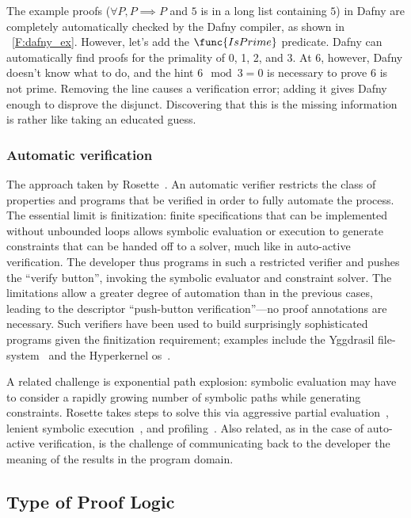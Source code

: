 The example proofs (\(\forall P, P \implies P\) and \(5\) is in a long list
containing \(5\)) in Dafny are completely automatically checked by the Dafny
compiler, as shown in \figurename~\ref{F:dafny_ex}. However, let's add the
\(\func{IsPrime}\) predicate. Dafny can automatically find proofs for the
primality of 0, 1, 2, and 3. At 6, however, Dafny doesn't know what to do, and
the hint \(6 \mod 3 = 0\) is necessary to prove 6 is not prime. Removing the
line causes a verification error; adding it gives Dafny enough to disprove the
disjunct. Discovering that this is the missing information is rather like taking
an educated guess.

\subsubsection{Automatic verification}

The approach taken by Rosette~\cite{Torlak_2013}. An automatic verifier
restricts the class of properties and programs that be verified in order to
fully automate the process. The essential limit is finitization: finite
specifications that can be implemented without unbounded loops allows symbolic
evaluation or execution to generate constraints that can be handed off to a
solver, much like in auto-active verification. The developer thus programs in
such a restricted verifier and pushes the ``verify button'', invoking the symbolic
evaluator and constraint solver. The limitations allow a greater degree of
automation than in the previous cases, leading to the descriptor ``push-button
verification''---no proof annotations are necessary. Such verifiers have been used
to build surprisingly sophisticated programs given the finitization requirement;
examples include the Yggdrasil file-system~\cite{Sigurbjarnarson_2016} and the
Hyperkernel \gls{os}~\cite{Nelson_2017}.

A related challenge is exponential path explosion: symbolic evaluation may have
to consider a rapidly growing number of symbolic paths while generating
constraints. Rosette takes steps to solve this via aggressive partial
evaluation~\cite{Torlak_2013,Torlak_2014}, lenient symbolic
execution~\cite{Chang_2018}, and
profiling~\cite{Bornholt_2018,Porncharoenwase_2020}. Also related, as in the
case of auto-active verification, is the challenge of communicating back to the
developer the meaning of the results in the program domain.

\subsection{Type of Proof Logic}\label{S:t_logic}


